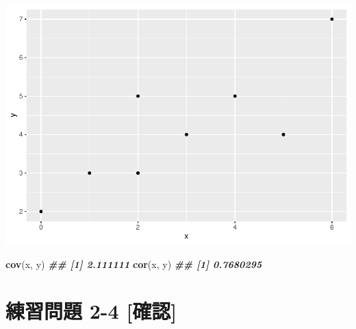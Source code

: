 \documentclass[
]{book}
\newenvironment{Shaded}{\begin{snugshade}}{\end{snugshade}}
\newcommand{\AttributeTok}[1]{\textcolor[rgb]{0.13,0.29,0.53}{#1}}
\newcommand{\DocumentationTok}[1]{\textcolor[rgb]{0.56,0.35,0.01}{\textbf{\textit{#1}}}}
\newcommand{\FunctionTok}[1]{\textcolor[rgb]{0.13,0.29,0.53}{\textbf{#1}}}
\newcommand{\NormalTok}[1]{#1}
\newcommand{\OtherTok}[1]{\textcolor[rgb]{0.56,0.35,0.01}{#1}}
\newcommand{\SpecialCharTok}[1]{\textcolor[rgb]{0.81,0.36,0.00}{\textbf{#1}}}
\newcommand{\StringTok}[1]{\textcolor[rgb]{0.31,0.60,0.02}{#1}}
\begin{document}
\begin{Shaded}
\end{Shaded}

\includegraphics{_main_files/figure-latex/unnamed-chunk-6-1.pdf}

\begin{Shaded}
\begin{Highlighting}[]

\FunctionTok{cov}\NormalTok{(x, y)}
\DocumentationTok{\#\# [1] 2.111111}
\FunctionTok{cor}\NormalTok{(x, y)}
\DocumentationTok{\#\# [1] 0.7680295}
\end{Highlighting}
\end{Shaded}

\hypertarget{ux7df4ux7fd2ux554fux984c-2-4-ux78baux8a8d}{%
\section*{練習問題 2-4 {[}確認{]}}\label{ux7df4ux7fd2ux554fux984c-2-4-ux78baux8a8d}}
\end{document}
